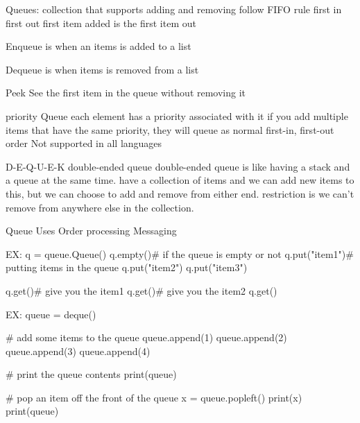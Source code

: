 Queues: 
  collection that supports adding and removing 
  follow FIFO  rule 
  first in first out 
  first item added is the first item out

  Enqueue 
    is when an items is added to a list 

  Dequeue 
    is when items is removed from a list 

  Peek 
    See the first item in the queue without removing it 

  priority Queue 
    each element has a priority associated with it 
    if you add multiple items that have the same priority, 
    they will queue as normal first-in, first-out order
    Not supported in all languages 

  D-E-Q-U-E-K 
  double-ended queue
    double-ended queue is like having a stack and a queue at the same time. 
    have a collection of items and we can add new items to this, 
    but we can choose to add and remove from either end. 
    restriction is we can't remove from anywhere else in the collection. 

  Queue Uses 
    Order processing 
    Messaging

    EX:
      q = queue.Queue()
      q.empty()# if the queue is empty or not 
      q.put("item1")# putting items in the queue 
      q.put("item2")
      q.put("item3")

      q.get()# give you the item1 
      q.get()# give you the item2
      q.get()

    EX: 
      queue = deque()

      # add some items to the queue
      queue.append(1)
      queue.append(2)
      queue.append(3)
      queue.append(4)

      # print the queue contents
      print(queue)

      # pop an item off the front of the queue
      x = queue.popleft()
      print(x)
      print(queue)
